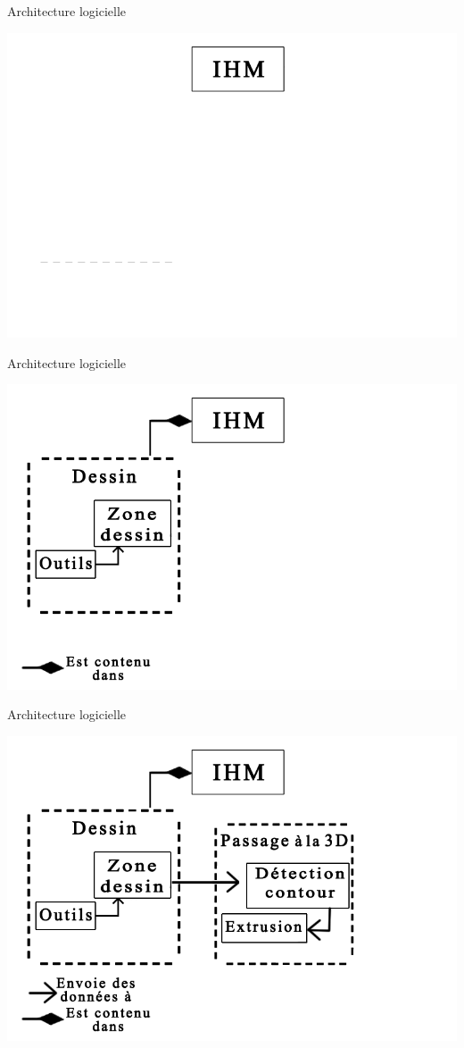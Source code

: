 \documentclass[a4paper,10pt]{beamer}
\begin{document}
	\begin{frame}{Architecture logicielle} %
		\centerline{\includegraphics[scale=0.3]{images/archilogi/archi1.png}}
	\end{frame}
	\begin{frame}{Architecture logicielle} %
		\centerline{\includegraphics[scale=0.3]{images/archilogi/archi2.png}}
	\end{frame}
	\begin{frame}{Architecture logicielle} %
		\centerline{\includegraphics[scale=0.3]{images/archilogi/archi3.png}}
	\end{frame}
\end{document}
